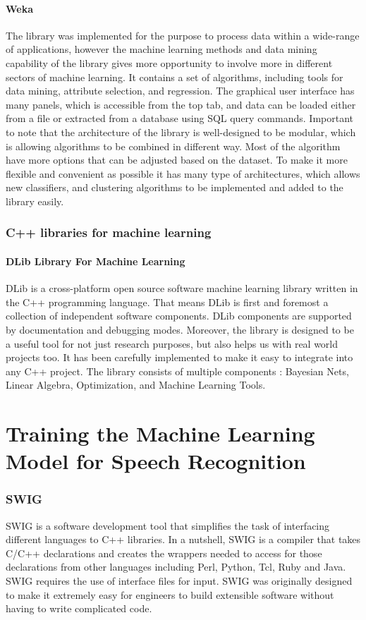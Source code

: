 \documentclass[english,12pt,oneside,a4paper]{article}
\begin{document}
		\subsection{Weka}
		The library was implemented for the purpose to process data within a wide-range of applications, however the machine learning methods and data mining capability of the library gives more opportunity to involve more in different sectors of machine learning. It contains a set of algorithms, including tools for data mining, attribute selection, and regression. The graphical user interface has many panels, which is accessible from the top tab, and data can be loaded either from a file or extracted from a database using SQL query commands. Important to note that the architecture of the library is well-designed to be modular, which is allowing algorithms to be combined in different way. Most of the algorithm have more options that can be adjusted based on the dataset. To make it more flexible and convenient as possible it has many type of architectures, which allows new classifiers, and clustering algorithms to be implemented and added to the library easily.
		\section{C++ libraries for machine learning}
		
		\subsection{DLib Library For Machine Learning}
		DLib is a cross-platform open source software machine learning library written in the C++ programming language.
		That means DLib  is first and foremost a collection of independent software components. DLib components are supported by documentation and debugging modes. Moreover, the library is designed to be a useful tool for not just  research purposes, but also helps us with real world projects too. It has been carefully implemented to make it easy to integrate into any C++ project. The library consists of multiple components : Bayesian Nets, Linear Algebra, Optimization, and Machine Learning Tools.
		
		
		
		\part{Training the Machine Learning Model for Speech Recognition}
		\section{SWIG}
		SWIG is a software development tool that simplifies the task of interfacing different languages to C++ libraries. In a nutshell, SWIG is a compiler that takes C/C++ declarations and creates the wrappers needed to access for those declarations from other languages including Perl, Python, Tcl, Ruby and Java. SWIG requires the use of interface files for input. SWIG was originally designed to make it extremely easy for engineers to build extensible software without having to write complicated code.  
\end{document}

